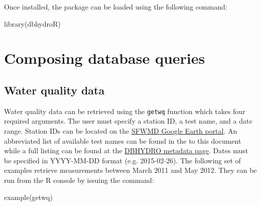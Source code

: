 \documentclass[12pt,notitlepage]{article}
\begin{document}
\vspace{8pt}
\noindent Once installed, the package can be loaded using the following command:


\begin{Schunk}
\begin{Sinput}
 library(dbhydroR)
\end{Sinput}
\end{Schunk}


\section{Composing database queries}
\subsection{Water quality data}

Water quality data can be retrieved using the \texttt{getwq} function which takes four required arguments. The user must specify a station ID, a test name, and a date range. Station IDs can be located on the \href{http://my.sfwmd.gov/KMLEXT/CUSTOMKMLS/DBHydro/DBHydroKML/DBHYDRO_KML.kmz}{SFWMD Google Earth portal}. An abbreviated list of available test names can be found in the  to this document while a full listing can be found at the \href{http://my.sfwmd.gov/dbhydroplsql/show_dbkey_info.show_data_type_info}{DBHYDRO metadata page}. Dates must be specified in YYYY-MM-DD format (e.g. 2015-02-26).   The following set of examples retrieve measurements between March 2011 and May 2012. They can be run from the R console by issuing the command:

\begin{Schunk}
\begin{Sinput}
 example(getwq)
\end{Sinput}
\end{Schunk}
\end{document}
